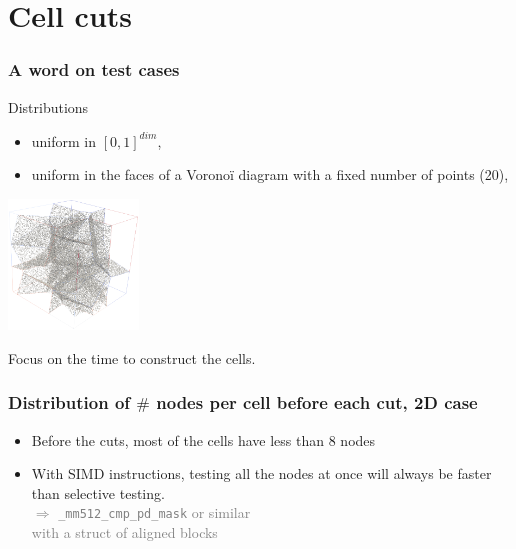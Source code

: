 \documentclass[aspectratio=169]{beamer}
\begin{document}
\section{Cell cuts}

\begin{frame}
    \frametitle{A word on test cases}

    Distributions
    \begin{itemize}
        \item uniform in $[0,1]^{dim}$,
        \item uniform in the faces of a Voronoï diagram with a fixed number of points (20),
    \end{itemize}

    \begin{center}
        
        \kern 1cm
        \includegraphics[width=0.26\textwidth]{img/voro_distrib_3d.png}
    \end{center}


    \vfill
    Focus on the time to construct the cells.
\end{frame}

\begin{frame}
    \frametitle{Distribution of $\#$ nodes per cell before each cut, 2D case}

    \begin{minipage}[c][0.6\textheight][c]{0.4\textwidth}
        
    \end{minipage}
    \textwidth
    \begin{minipage}{0.55\textwidth}
        \begin{itemize}
            \item Before the cuts, most of the cells have less than 8 nodes
            
            \bigskip
            \item With SIMD instructions, testing all the nodes at once will
                  always be faster than selective testing. 
                  \\ \hfill {\textcolor{gray}{$\Rightarrow$ \texttt{\_mm512\_cmp\_pd\_mask} or similar}}
                  \\ \hfill {\textcolor{gray}{with a struct of aligned blocks}}
              \end{itemize}
    \end{minipage}
\end{frame}
\end{document}
